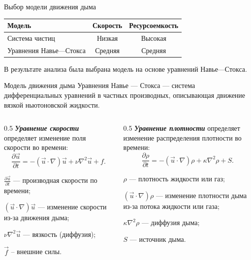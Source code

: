 \documentclass{beamer}
\begin{document}
    \begin{frame}{Выбор модели движения дыма}
        \begin{longtable}{|l|c|c|}
        \hline
        \textbf{Модель} & \textbf{Скорость} & \textbf{Ресурсоемкость} \\
        \hline
        Система чистиц & Низкая & Высокая\\
        \hline
        \rowcolor{LightCyan}
        Уравнения Навье---Стокса & Средняя & Средняя \\
        \hline
    \end{longtable}

    В результате анализа была выбрана модель на основе уравнений Навье---Стокса.
    \end{frame}
    \begin{frame}{Модель движения дыма}
        Уравнения Навье --- Стокса — система дифференциальных уравнений в частных производных, описывающая движение вязкой ньютоновской жидкости.
        \begin{columns}[t]
            \begin{column}{0.5\textwidth}
                \textbf{\textit{Уравнение скорости}} определяет изменение поля скорости во времени:
                $$
                    \frac{\partial \vec{u}}{\partial t} = - (\vec{u} \cdot \nabla) \vec{u} + \nu \nabla^2 \vec{u} + f.$$ 
                \begin{itemize}
                {\small
        \item [---] $\frac{\partial \vec{u}}{\partial t}$ --- производная скорости по времени;
        \item[---] $(\vec{u} \cdot \nabla) \vec{u}$ --- изменение скорости из-за движения дыма;
        \item[---] \(\nu \nabla^2 \vec{u}\) --- вязкость (диффузия);
        \item[---] \(\vec{f}\) -- внешние силы.
        }
    \end{itemize}
            \end{column}
            \begin{column}{0.5\textwidth}
                \textbf{\textit{Уравнение плотности}} определяет изменение распределения плотности во времени:
        $$\frac{\partial \rho}{\partial t} = -(\vec{u} \cdot \nabla) \rho + \kappa \nabla^2 \rho + S.$$ 
    \begin{itemize}
    {\small
        \item[---] \(\rho\) --- плотность жидкости или газ;
        \item[---] \((\vec{u} \cdot \nabla) \rho\) --- изменение плотности дыма из-за потока жидкости или газа;
        \item[---] \(\kappa \nabla^2 \rho\) --- диффузия дыма;
        \item[---] \(S\) --- источник дыма.
        }
    \end{itemize}
            \end{column}
        \end{columns} 
    \end{frame}
\end{document}
